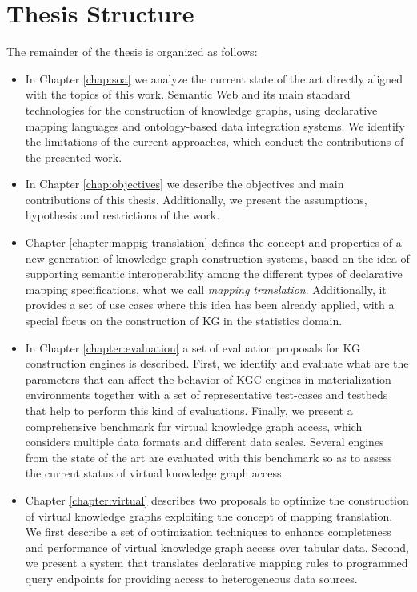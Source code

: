 \section{Thesis Structure}
\label{sec:thesisstructure}
The remainder of the thesis is organized as follows:
\begin{itemize}
    \item In Chapter \ref{chap:soa} we analyze the current state of the art directly aligned with the topics of this work. Semantic Web and its main standard technologies for the construction of knowledge graphs, using declarative mapping languages and ontology-based data integration systems. We identify the limitations of the current approaches, which conduct the contributions of the presented work.
    \item In Chapter \ref{chap:objectives} we describe the objectives and main contributions of this thesis. Additionally, we present the assumptions, hypothesis and restrictions of the work.
    \item Chapter \ref{chapter:mappig-translation} defines the concept and properties of a new generation of knowledge graph construction systems, based on the idea of supporting semantic interoperability among the different types of declarative mapping specifications, what we call \textit{mapping translation}. Additionally, it provides a set of use cases where this idea has been already applied, with a special focus on the construction of KG in the statistics domain.
    \item In Chapter \ref{chapter:evaluation} a set of evaluation proposals for KG construction engines is described. First, we identify and evaluate what are the parameters that can affect the behavior of KGC engines in materialization environments together with a set of representative test-cases and testbeds that help to perform this kind of evaluations. Finally, we present a comprehensive benchmark for virtual knowledge graph access, which considers multiple data formats and different data scales. Several engines from the state of the art are evaluated with this benchmark so as to assess the current status of virtual knowledge graph access. 
    \item Chapter \ref{chapter:virtual} describes two proposals to optimize the construction of virtual knowledge graphs exploiting the concept of mapping translation. We first describe a set of optimization techniques to enhance completeness and performance of virtual knowledge graph access over tabular data. Second, we present a system that translates declarative mapping rules to programmed query endpoints for providing access to heterogeneous data sources.

\end{itemize}
